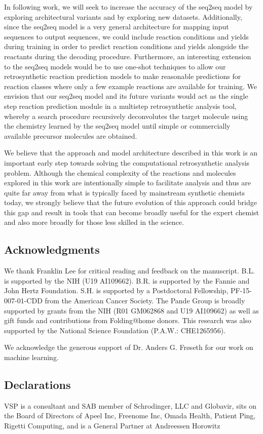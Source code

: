 In following work, we will seek to increase the accuracy of the seq2seq model by exploring architectural variants and by exploring new datasets. Additionally, since the seq2seq model is a very general architecture for mapping input sequences to output sequences, we could include reaction conditions and yields during training in order to predict reaction conditions and yields alongside the reactants during the decoding procedure. Furthermore, an interesting extension to the seq2seq models would be to use one-shot techniques \cite{vinyals2016matching, santoro2016one, altae2017low} to allow our retrosynthetic reaction prediction models to make reasonable predictions for reaction classes where only a few example reactions are available for training. We envision that our seq2seq model and its future variants would act as the single step reaction prediction module in a multistep retrosynthetic analysis tool, whereby a search procedure recursively deconvolutes the target molecule using the chemistry learned by the seq2seq model until simple or commercially available precursor molecules are obtained.

We believe that the approach and model architecture described in this work is an important early step towards solving the computational retrosynthetic analysis problem. Although the chemical complexity of the reactions and molecules explored in this work are intentionally simple to facilitate analysis and thus are quite far away from what is typically faced by mainstream synthetic chemists today, we strongly believe that the future evolution of this approach could bridge this gap and result in tools that can become broadly useful for the expert chemist and also more broadly for those less skilled in the science.

\subsection{Acknowledgments}

We thank Franklin Lee for critical reading and feedback on the manuscript. 
B.L. is supported by the NIH (U19 AI109662). B.R. is supported by the Fannie and John Hertz Foundation. S.H. is supported by a Postdoctoral Fellowship, PF-15-007-01-CDD from the American Cancer Society.
The Pande Group is broadly supported by grants from the NIH (R01 GM062868 and U19 AI109662) as well as gift funds and contributions from Folding@home donors. This research was also supported by the National Science Foundation (P.A.W.: CHE1265956).

We acknowledge the generous support of Dr. Anders G. Frøseth for our work on machine learning.

\subsection{Declarations}

VSP is a consultant and SAB member of Schrodinger, LLC and Globavir, sits on the Board of Directors of Apeel Inc, Freenome Inc, Omada Health, Patient Ping, Rigetti Computing, and is a General Partner at Andreessen Horowitz
